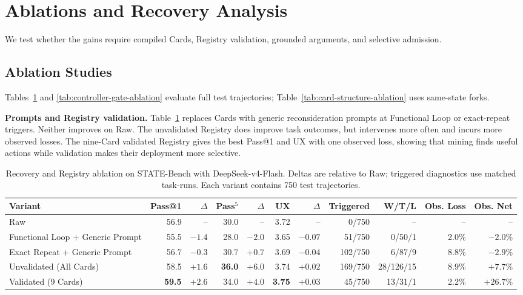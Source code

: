 \section{Ablations and Recovery Analysis}
\label{sec:analysis}

We test whether the gains require compiled Cards, Registry validation, grounded
arguments, and selective admission.

\subsection*{Ablation Studies}

Tables~\ref{tab:compiled-selection} and
\ref{tab:controller-gate-ablation} evaluate full test trajectories;
Table~\ref{tab:card-structure-ablation} uses same-state forks.

\textbf{Prompts and Registry validation.}
Table~\ref{tab:compiled-selection} replaces Cards with generic reconsideration
prompts at Functional Loop or exact-repeat triggers. Neither improves on Raw.
The unvalidated Registry does improve task outcomes, but intervenes more often
and incurs more observed losses. The nine-Card validated Registry gives the
best Pass@1 and UX with one observed loss, showing that mining finds useful
actions while validation makes their deployment more selective.

\begin{table}[!t]
\centering
\scriptsize
\renewcommand{\arraystretch}{0.9}
\setlength{\tabcolsep}{2.5pt}
\begin{tabular*}{\textwidth}{@{\extracolsep{\fill}}lrrrrrrrrrr@{}}
\toprule
Variant & Pass@1 & $\Delta$ & Pass$^5$ & $\Delta$ & UX & $\Delta$
& Triggered & W/T/L & Obs. Loss & Obs. Net \\
\midrule
Raw & 56.9 & -- & 30.0 & -- & 3.72 & -- & 0/750 & -- & -- & -- \\
Functional Loop + Generic Prompt & 55.5 & $-1.4$ & 28.0 & $-2.0$ & 3.65 & $-0.07$
& 51/750 & 0/50/1 & 2.0\% & $-2.0$\% \\
Exact Repeat + Generic Prompt & 56.7 & $-0.3$ & 30.7 & $+0.7$ & 3.69 & $-0.04$
& 102/750 & 6/87/9 & 8.8\% & $-2.9$\% \\
Unvalidated (All Cards) & 58.5 & $+1.6$ & \textbf{36.0} & $+6.0$ & 3.74 & $+0.02$
& 169/750 & 28/126/15 & 8.9\% & $+7.7$\% \\
Validated (9 Cards) & \textbf{59.5} & \textbf{$+2.6$} & 34.0 & $+4.0$ & \textbf{3.75}
& \textbf{$+0.03$} & 45/750 & 13/31/1 & 2.2\% & $+26.7$\% \\
\bottomrule
\end{tabular*}
\setlength{\tabcolsep}{6pt}
\renewcommand{\arraystretch}{1.0}
\caption{Recovery and Registry ablation on STATE-Bench with
DeepSeek-v4-Flash. Deltas are relative to Raw; triggered diagnostics use
matched task-runs. Each variant contains 750 test trajectories.}
\label{tab:compiled-selection}
\end{table}

